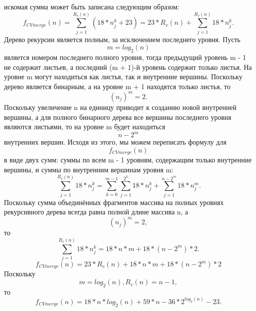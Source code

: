 \documentclass[12pt,a4paper]{scrartcl}
\begin{document}
искомая сумма может быть записана следующим образом:
\begin{equation}\label{eq2.26}
f_{CV merge} (n) = \sum \limits_{j=1}^{R_v(n)} (18*n_j^k + 23) = 23*R_v(n) +  \sum \limits_{j=1}^{R_v(n)} 18*n_j^k.
\end{equation}
Дерево рекурсии является полным, за исключением последнего уровня. Пусть
\begin{equation}\label{eq2.27}
m = log_2(n)
\end{equation}
является номером последнего полного уровня, тогда предыдущий уровень m - 1 не содержит листьев, а последний (m + 1)-й уровень содержит только листья. На уровне m могут находиться как листья, так и внутренние вершины. Поскольку дерево является бинарным, а на уровне m + 1 находятся только листья, то 
\begin{equation*}
(n_j)^m = 2.
\end{equation*}
Поскольку увеличение n на единицу приводит к созданию новой внутренней вершины, а для полного бинарного дерева все вершины последнего уровня являются листьями, то на уровне m будет находиться
\begin{equation*}
n - 2^m
\end{equation*}
внутренних вершин. Исходя из этого, мы можем переписать формулу для 
\begin{equation*}
f_{CV merge}(n)
\end{equation*}
в виде двух сумм: суммы по всем m - 1 уровням, содержащим только внутренние вершины, и суммы по внутренним вершинам уровня m:
\begin{equation}\label{eq2.28}
 \sum \limits_{j=1}^{R_v(n)} 18*n_j^k = \sum \limits_{k=0}^{m-1} \sum \limits_{j=1}^{2^k} 18*n_j^k + \sum \limits_{j=1}^{n-2^m} 18*n_j^m.
\end{equation}
Поскольку сумма объединённых фрагментов массива на полных уровнях рекурсивного дерева всегда равна полной длине массива n, а
\begin{equation*}
(n_j)^m = 2,
\end{equation*}
то
\begin{equation}\label{eq2.29}
 \sum \limits_{j=1}^{R_v(n)} 18*n_j^k = 18*n*m + 18*(n - 2^m) *2.
\end{equation}
\begin{equation}\label{eq2.30}
f_{CV merge}(n) = 23*R_v(n) + 18*n*m + 18*(n - 2^m)*2
\end{equation}
Поскольку
\begin{equation*}
m = log_2(n), R_v(n) = n - 1,
\end{equation*}
то
\begin{equation}\label{eq2.31}
f_{CV merge}(n) = 18*n*log_2(n) + 59*n - 36*2^{log_2(n)} - 23.
\end{equation}
\end{document}
